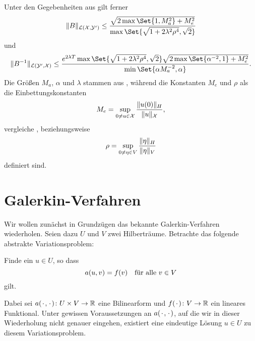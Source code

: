 \begin{Korollar}
    Unter den Gegebenheiten aus  gilt ferner
    \begin{equation}
        \label{eq:var_all_norm_B}
        \norm{B}_{\mathcal L(\mathcal X, \mathcal Y')} \leq \frac{\sqrt{2\max\Set{1, M_{a}^{2}} + M_{e}^{2}}}{\max\Set{\sqrt{1 + 2 \lambda^{2} \rho^{4}}, \sqrt{2}}}
    \end{equation}
    und
    \begin{equation}
        \label{eq:var_all_norm_B_inv}
        \norm{B^{-1}}_{\mathcal L(\mathcal Y', \mathcal X)} \leq \frac{e^{2 \lambda T} \max\Set{\sqrt{1 + 2 \lambda^{2} \rho^{4}}, \sqrt{2}} \sqrt{2 \max\Set{ \alpha^{-2}, 1} + M_{e}^{2}}}{\min\Set{\alpha M_{a}^{-2}, \alpha}}.
    \end{equation}
    Die Größen $M_{a}$, $\alpha$ und $\lambda$ stammen aus ,
    während die Konstanten $M_{e}$ und $\rho$ als die Einbettungskonstanten
    \begin{equation}
        \label{eq:var_all_M_e}
        M_{e} = \sup_{0 \neq u \in \mathcal X} \frac{\norm{u(0)}_{H}}{\norm{u}_{\mathcal X}},
    \end{equation}
    vergleiche , beziehungsweise
    \begin{equation}
        \label{eq:var_all_rho}
        \rho = \sup_{0 \neq \eta \in V} \frac{\norm{\eta}_{H}}{\norm{\eta}_{V}}
    \end{equation}
    definiert sind.
\end{Korollar}


\section{Galerkin-Verfahren} %
\label{sec:galerkin_verfahren}

Wir wollen zunächst in Grundzügen das bekannte Galerkin-Verfahren wiederholen.
Seien dazu $U$ und $V$ zwei Hilberträume.
Betrachte das folgende abstrakte Variationsproblem:
\begin{Problem}
    Finde ein $u \in U$, so dass
    \begin{equation}
        a(u, v) = f(v) \quad \fa v \in V
    \end{equation}
    gilt.
\end{Problem}
Dabei sei $a(\blank, \blank) \colon U \times V \to \mathbb{R}$ eine Bilinearform und $f(\blank) \colon V \to \mathbb{R}$ ein lineares Funktional.
Unter gewissen Voraussetzungen an $a(\blank, \blank)$, auf die wir in dieser Wiederholung nicht genauer eingehen, existiert eine eindeutige Lösung $u \in U$ zu diesem Variationsproblem.

